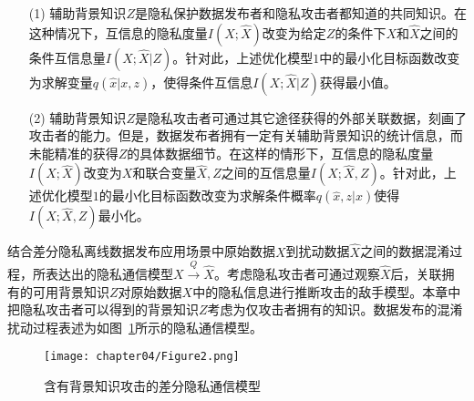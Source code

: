%
\begin{itemize}[leftmargin=2em]
\item [(1)]辅助背景知识$Z$是隐私保护数据发布者和隐私攻击者都知道的共同知识。在这种情况下，互信息的隐私度量$I(X;\hat{X})$改变为给定$Z$的条件下$X$和$\hat{X}$之间的条件互信息量$I(X;\hat{X}|Z)$。针对此，上述优化模型$1$中的最小化目标函数改变为求解变量$q(\hat{x}|x,z)$，使得条件互信息$I(X;\hat{X}|Z)$获得最小值。

\item [(2)]辅助背景知识$Z$是隐私攻击者可通过其它途径获得的外部关联数据，刻画了攻击者的能力。但是，数据发布者拥有一定有关辅助背景知识的统计信息，而未能精准的获得$Z$的具体数据细节。在这样的情形下，互信息的隐私度量$I(X;\hat{X})$改变为$X$和联合变量$\hat{X},Z$之间的互信息量$I(X;\hat{X},Z)$。针对此，上述优化模型$1$的最小化目标函数改变为求解条件概率$q(\hat{x},z|x)$使得$I(X;\hat{X},Z)$最小化。
\end{itemize}

结合差分隐私离线数据发布应用场景中原始数据$X$到扰动数据$\hat{X}$之间的数据混淆过程，所表达出的隐私通信模型$X\xrightarrow{Q}\hat{X}$。考虑隐私攻击者可通过观察$\hat{X}$后，关联拥有的可用背景知识$Z$对原始数据$X$中的隐私信息进行推断攻击的敌手模型。本章中把隐私攻击者可以得到的背景知识$Z$考虑为仅攻击者拥有的知识。数据发布的混淆扰动过程表述为如图~\ref{Fig:chapter05-2}所示的隐私通信模型。
\begin{figure}[htbp]
	\centering
	\texttt{[image: chapter04/Figure2.png]}
	\caption{含有背景知识攻击的差分隐私通信模型}
	\label{Fig:chapter05-2}
\end{figure}

